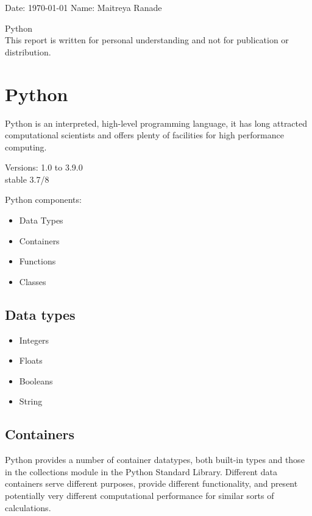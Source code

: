 \documentclass[12pt, a4paper]{article}
\begin{document}
	\onehalfspacing
	Date: \today{} \hfill{} Name: Maitreya Ranade
	\begin{center}
		\vspace*{\fill}
		{\LARGE Python} \\
		This report is written for personal understanding and not for publication or distribution.
		\vspace*{\fill}
	\end{center}
	
	\pagebreak
	\singlespacing
	\tableofcontents
	\pagebreak
	
    \section{Python}
    Python is an interpreted, high-level programming language, it has long attracted computational scientists and offers plenty of facilities for high performance computing.
    
    Versions:
    1.0 to 3.9.0 \\
    stable 3.7/8
    
    Python components:
    
	\begin{itemize}
        \item Data Types
        \item Containers
        \item Functions
        \item Classes
	\end{itemize}

    
    
    
    

    \subsection{Data types}
    
	\begin{itemize}
        \item Integers
        \item Floats
        \item Booleans
        \item String
	\end{itemize}
    
    
    
    

    \subsection{Containers}
    Python provides a number of container datatypes, both built-in types and those in the collections module in the Python Standard Library. Different data containers serve different purposes, provide different functionality, and present potentially very different computational performance for similar sorts of calculations. 
\end{document}
